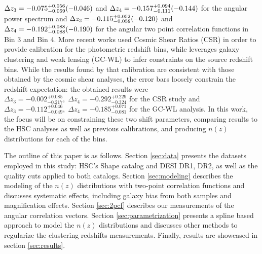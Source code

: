 $\Delta z_3=-0.075^{+0.056}_{
-0.059} (-0.046)$ and $\Delta z_4=-0.157^{+0.094}_{-0.111} (-0.144)$ 
for the angular power spectrum \cite{Dalal2023CosmoShearHSC} and 
$\Delta z_3=-0.115^{+0.052}
_{-0.058} (-0.120)$ and $
\Delta z_4=-0.192^{+0.088}
_{-0.088} (-0.190)$ 
for the angular two point correlation functions \cite{CosmoShearLi2023HSCY3} in Bin 3 and Bin 4. 
More recent works \cite{Rana2025HSCY3CosmicShearRatios} used Cosmic Shear Ratios (CSR) in order to provide calibration for the photometric redshift bins, while \cite{Zhang2025RedshiftGCPointMass} leverages galaxy clustering and weak lensing (GC-WL) to infer constraints on the source redshift bins. 
While the results found by that calibration are consistent with those obtained by the cosmic shear analyses, the error bars loosely constrain the redshift expectation: the obtained results were $\Delta z_3 = -0.002^{+0.085}_{-0.217},\;\Delta z_4 = -0.292^{+0.229}_{-0.324}$ for the CSR study and $\Delta z_3 =-0.112^{+0.046}_{-0.049},\;\Delta z_4 =-0.185^{+0.071}_{-0.081}$ for the GC-WL analysis. 
In this work, the focus will be on constraining these two shift parameters, comparing results to the HSC analyses as well as previous calibrations, and producing $n(z)$ distributions for each of the bins. 

The outline of this paper is as follows. 
Section \ref{sec:data} presents the datasets employed in this study: HSC’s Shape catalog and DESI DR1, DR2, as well as the quality cuts applied to both catalogs. 
Section \ref{sec:modeling} describes the modeling of the $n(z)$ distributions with two-point correlation functions and discusses systematic effects, including galaxy bias from both samples and magnification effects. 
Section \ref{sec:2pcf} describes our measurements of the angular correlation vectors. 
Section \ref{sec:parametrization} presents a spline based approach to model the $n(z)$ distributions and discusses other methods to regularize the clustering redshifts measurements. 
Finally, results are showcased in section \ref{sec:results}.